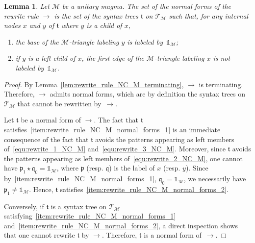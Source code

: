 \documentclass[10pt,reqno]{amsart}
\numberwithin{equation}{subsection}
\newtheorem{Lemma}[Theorem]{Lemma}
\newcommand{\Mca}{\mathcal{M}}
\newcommand{\Tfr}{\mathfrak{t}}
\newcommand{\Pfr}{\mathfrak{p}}
\newcommand{\Qfr}{\mathfrak{q}}
\newcommand{\Unit}{\mathds{1}}
\newcommand{\Op}{\star}
\newcommand{\Rew}{\to}
\newcommand{\Triangles}{\mathcal{T}}
\begin{document}
\begin{Lemma} \label{lem:rewrite_rule_NC_M_normal_forms}
    Let $\Mca$ be a unitary magma. The set of the normal forms of the
    rewrite rule $\Rew$ is the set of the syntax trees $\Tfr$ on
    $\Triangles_\Mca$ such that, for any internal nodes $x$ and $y$ of
    $\Tfr$ where $y$ is a child of $x$,
    \begin{enumerate}[fullwidth,label={(\it\roman*)}]
        \item \label{item:rewrite_rule_NC_M_normal_forms_1}
        the base of the $\Mca$-triangle labeling $y$ is labeled
        by~$\Unit_\Mca$;
        \item \label{item:rewrite_rule_NC_M_normal_forms_2}
        if $y$ is a left child of $x$, the first edge of the
        $\Mca$-triangle labeling $x$ is not labeled by~$\Unit_\Mca$.
    \end{enumerate}
\end{Lemma}
\begin{proof}
    By Lemma~\ref{lem:rewrite_rule_NC_M_terminating}, $\Rew$ is
    terminating. Therefore, $\Rew$ admits normal forms, which are by
    definition the syntax trees on $\Triangles_\Mca$ that cannot be
    rewritten by~$\Rew$.
    \smallskip

    Let $\Tfr$ be a normal form of $\Rew$. The fact that $\Tfr$
    satisfies~\ref{item:rewrite_rule_NC_M_normal_forms_1} is an
    immediate consequence of the fact that $\Tfr$ avoids the patterns
    appearing as left members of~\eqref{equ:rewrite_1_NC_M}
    and~\eqref{equ:rewrite_3_NC_M}. Moreover, since $\Tfr$ avoids the
    patterns appearing as left members of~\eqref{equ:rewrite_2_NC_M},
    one cannot have $\Pfr_1 \Op \Qfr_0 = \Unit_\Mca$, where $\Pfr$
    (resp. $\Qfr$) is the label of $x$ (resp. $y$). Since
    by~\ref{item:rewrite_rule_NC_M_normal_forms_1},
    $\Qfr_0 = \Unit_\Mca$, we necessarily have $\Pfr_1 \ne \Unit_\Mca$.
    Hence, $\Tfr$ satisfies~\ref{item:rewrite_rule_NC_M_normal_forms_2}.
    \smallskip

    Conversely, if $\Tfr$ is a syntax tree on $\Triangles_\Mca$
    satisfying~\ref{item:rewrite_rule_NC_M_normal_forms_1}
    and~\ref{item:rewrite_rule_NC_M_normal_forms_2}, a direct inspection
    shows that one cannot rewrite $\Tfr$ by $\Rew$. Therefore, $\Tfr$ is
    a normal form of~$\Rew$.
\end{proof}
\medskip
\end{document}
